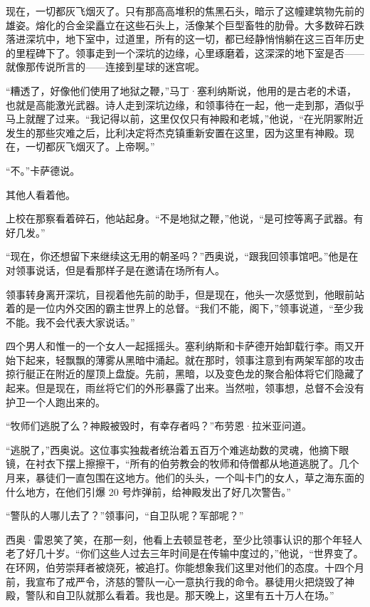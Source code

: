 \documentclass[AutoFakeBold=true]{book}
\begin{document}
现在，一切都灰飞烟灭了。只有那高高堆积的焦黑石头，暗示了这幢建筑物先前的雄姿。熔化的合金梁矗立在这些石头上，活像某个巨型畜牲的肋骨。大多数碎石跌落进深坑中，地下室中，过道里，所有的这一切，都已经静悄悄躺在这三百年历史的里程碑下了。领事走到一个深坑的边缘，心里琢磨着，这深深的地下室是否——就像那传说所言的——连接到星球的迷宫呢。

``糟透了，好像他们使用了地狱之鞭，''马丁·塞利纳斯说，他用的是古老的术语，也就是高能激光武器。诗人走到深坑边缘，和领事待在一起，他一走到那，酒似乎马上就醒了过来。``我记得以前，这里仅仅只有神殿和老城，''他说，``在光阴冢附近发生的那些灾难之后，比利决定将杰克镇重新安置在这里，因为这里有神殿。现在，一切都灰飞烟灭了。上帝啊。''

``不。''卡萨德说。

其他人看着他。

上校在那察看着碎石，他站起身。``不是地狱之鞭，''他说，``是可控等离子武器。有好几发。''

``现在，你还想留下来继续这无用的朝圣吗？''西奥说，``跟我回领事馆吧。''他是在对领事说话，但是看那样子是在邀请在场所有人。

领事转身离开深坑，目视着他先前的助手，但是现在，他头一次感觉到，他眼前站着的是一位内外交困的霸主世界上的总督。``我们不能，阁下，''领事说道，``至少我不能。我不会代表大家说话。''

四个男人和惟一的一个女人一起摇摇头。塞利纳斯和卡萨德开始卸载行李。雨又开始下起来，轻飘飘的薄雾从黑暗中涌起。就在那时，领事注意到有两架军部的攻击掠行艇正在附近的屋顶上盘旋。先前，黑暗，以及变色龙的聚合船体将它们隐藏了起来。但是现在，雨丝将它们的外形暴露了出来。当然啦，领事想，总督不会没有护卫一个人跑出来的。

``牧师们逃脱了么？神殿被毁时，有幸存者吗？''布劳恩·拉米亚问道。

``逃脱了，''西奥说。这位事实独裁者统治着五百万个难逃劫数的灵魂，他摘下眼镜，在衬衣下摆上擦擦干，``所有的伯劳教会的牧师和侍僧都从地道逃脱了。几个月来，暴徒们一直包围在这地方。他们的头头，一个叫卡门的女人，草之海东面的什么地方，在他们引爆 20 号炸弹前，给神殿发出了好几次警告。''

``警队的人哪儿去了？''领事问，``自卫队呢？军部呢？''

西奥·雷恩笑了笑，在那一刻，他看上去顿显苍老，至少比领事认识的那个年轻人老了好几十岁。``你们这些人过去三年时间是在传输中度过的，''他说，``世界变了。在环网，伯劳崇拜者被烧死，被追打。你能想象我们这里对他们的态度。十四个月前，我宣布了戒严令，济慈的警队一心一意执行我的命令。暴徒用火把烧毁了神殿，警队和自卫队就那么看着。我也是。那天晚上，这里有五十万人在场。''
\end{document}
